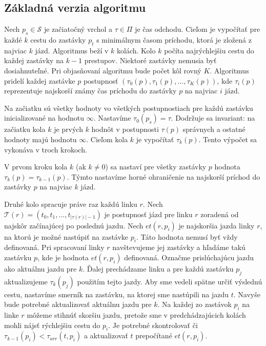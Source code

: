 \subsection{Základná verzia algoritmu}
\label{sub:raptor-basic}

Nech $p_s \in \mathcal{S}$ je začiatočný vrchol a $\tau \in \Pi$ je čas odchodu. Cieľom je vypočítať pre každé $k$ cestu do zastávky $p_t$ s minimálnym časom príchodu, ktorá je zložená z najviac $k$ jázd. Algoritmus beží v $k$ kolách. Kolo $k$ počíta najrýchlejšiu cestu do každej zastávky na $k-1$ prestupov. Niektoré zastávky nemusia byť dosiahnuteľné. Pri objasňovaní algoritmu bude počet kôl rovný $K$. Algoritmus pridelí každej zastávke $p$ postupnosť $(\tau_0(p), \tau_1(p), ..., \tau_K(p))$, kde $\tau_i(p)$ reprezentuje najskorší známy čas príchodu do zastávky $p$ na najviac $i$ jázd. 

Na začiatku sú všetky hodnoty vo všetkých postupnostiach pre každú zastávku inicializované na hodnotu $\infty$. Nastavíme $\tau_0(p_s) = \tau$. Dodržuje sa invariant: na začiatku kola $k$ je prvých $k$ hodnôt v postupnosti $\tau(p)$ správnych a ostatné hodnoty majú hodnotu $\infty$. Cieľom kola $k$ je vypočítať $\tau_k(p)$. Tento výpočet sa vykonáva v troch krokoch. 
 
V prvom kroku kola $k$ (ak $k \neq 0$) sa nastaví pre všetky zastávky $p$ hodnota $\tau_k(p) = \tau_{k-1}(p)$. Týmto nastavíme horné ohraničenie na najskorší príchod do zastávky $p$ na najviac $k$ jázd.

Druhé kolo spracuje práve raz každú linku $r$. Nech $\mathcal{T}(r) = (t_0, t_1, ..., t_{|\tau(r)|-1})$ je postupnosť jázd pre linku $r$ zoradená od najskôr začínajúcej po poslednú jazdu. Nech $et(r, p_i)$ je najskoršia jazda linky $r$, na ktorú je možné nastúpiť na zastávke $p_i$. Táto hodnota nemusí byť vždy definovaná. Pri spracovaní linky $r$ navštevujeme jej zastávky a hľadáme takú zastávku $p$, kde je hodnota $et(r, p_i)$ definovaná. Označme prislúchajúcu jazdu ako aktuálnu jazdu pre $k$. Ďalej prechádzame linku a pre každú zastávku $p_j$ aktualizujeme $\tau_k(p_j)$ použitím tejto jazdy. Aby sme vedeli spätne určiť výslednú cestu, nastavíme smerník na zastávku, na ktorej sme nastúpili na jazdu $t$. Navyše bude potrebné aktualizovať aktuálnu jazdu pre $k$. Na každej zo zastávok $p_i$ na linke $r$ môžeme stihnúť skoršiu jazdu, pretože sme v predchádzajúcich kolách mohli nájsť rýchlejšiu cestu do $p_i$. Je potrebné skontrolovať či $\tau_{k-1}(p_i) < \tau_{arr}(t, p_i)$ a aktualizovať $t$ prepočítané $et(r, p_i)$.

